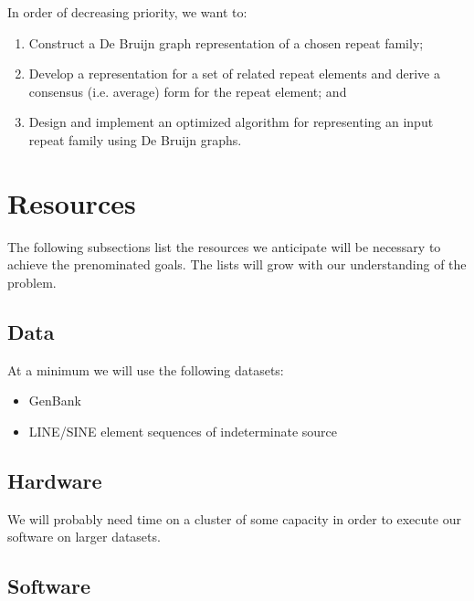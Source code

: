 \documentclass[dvips,12pt]{article}
\begin{document}
In order of decreasing priority, we want to:
\begin{enumerate}
\item Construct a De Bruijn graph representation of a chosen repeat
  family;
\item Develop a representation for a set of related repeat elements and
  derive a consensus (i.e. average) form for the repeat element; and
\item Design and implement an optimized algorithm for representing an
  input repeat family using De Bruijn graphs.
\end{enumerate}

\section{Resources}

The following subsections list the resources we anticipate will be
necessary to achieve the prenominated goals.  The lists will grow with
our understanding of the problem.

\subsection{Data}

At a minimum we will use the following datasets:
\begin{itemize}
\item GenBank
\item LINE/SINE element sequences of indeterminate source
\end{itemize}

\subsection{Hardware}

We will probably need time on a cluster of some capacity in order to
execute our software on larger datasets.

\subsection{Software}
\end{document}
